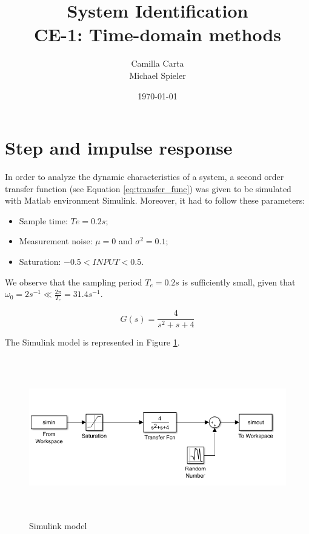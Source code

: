 \documentclass[a4paper,11pt]{article}
\begin{document}
\title{
    System Identification \\
    CE-1: Time-domain methods
}
\author{Camilla Carta \\ Michael Spieler}
\date{\today}
\maketitle

\section{Step and impulse response}

In order to analyze the dynamic characteristics of a system, a second order transfer function (see Equation \ref{eq:transfer_func}) was given to be simulated with Matlab environment Simulink. Moreover, it had to follow these parameters:

\begin{itemize}
\item Sample time: $Te = 0.2s$;
\item Measurement noise: $\mu = 0$ and $\sigma^2 = 0.1$;
\item Saturation: $-0.5<INPUT<0.5$.
\end{itemize}

We observe that the sampling period $T_e = 0.2s$ is sufficiently small, given that $\omega_0 = 2s^{-1} \ll \frac{2\pi}{T_e} = 31.4s^{-1}$.

\begin{equation}
	G(s) = \frac{4}{s^2+s+4}
    \label{eq:transfer_func}
\end{equation}

The Simulink model is represented in Figure \ref{fig:simlink}. 

\begin{figure}[H]
	\centering
    \includegraphics[height=7cm]{images/simlink}
    \caption{Simulink model}
    \label{fig:simlink}
\end{figure}
\end{document}
